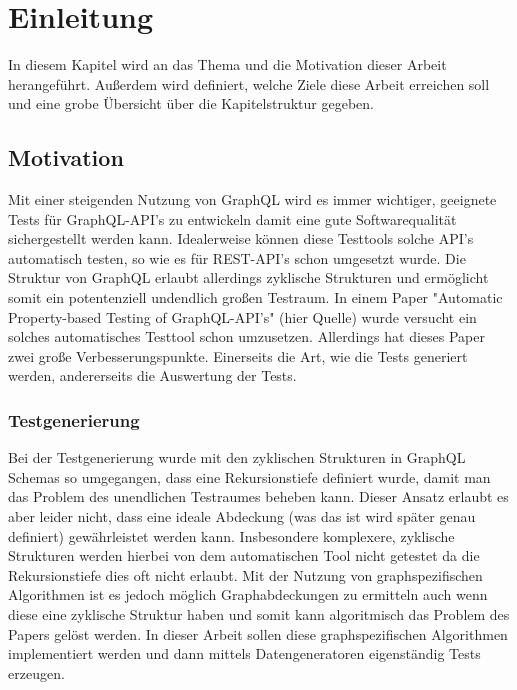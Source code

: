 \section{Einleitung}

In diesem Kapitel wird an das Thema und die Motivation dieser Arbeit herangeführt.
Außerdem wird definiert, welche Ziele diese Arbeit erreichen soll und eine grobe Übersicht über die
Kapitelstruktur gegeben.

\subsection{Motivation}

Mit einer steigenden Nutzung von GraphQL wird es immer wichtiger, geeignete Tests für GraphQL-API's zu entwickeln damit eine
gute Softwarequalität sichergestellt werden kann. Idealerweise können diese Testtools solche API's automatisch testen,
so wie es für REST-API's schon umgesetzt wurde. Die Struktur von GraphQL erlaubt allerdings zyklische Strukturen
und ermöglicht somit ein potentenziell undendlich großen Testraum.
In einem Paper "Automatic Property-based Testing of GraphQL-API's" (hier Quelle) wurde versucht ein solches
automatisches Testtool schon umzusetzen. Allerdings hat dieses Paper zwei große Verbesserungspunkte. 
Einerseits die Art, wie die Tests generiert werden, andererseits die Auswertung der Tests.

\subsubsection*{Testgenerierung}

Bei der Testgenerierung wurde mit den zyklischen Strukturen in GraphQL Schemas so
umgegangen, dass eine Rekursionstiefe definiert wurde, damit man das Problem des unendlichen Testraumes beheben kann.
Dieser Ansatz erlaubt es aber leider nicht, dass eine ideale Abdeckung (was das ist wird später genau
definiert) gewährleistet werden kann.
Insbesondere komplexere, zyklische Strukturen werden hierbei von dem automatischen
Tool nicht getestet da die Rekursionstiefe dies oft nicht erlaubt.
Mit der Nutzung von graphspezifischen Algorithmen ist es jedoch möglich Graphabdeckungen zu ermitteln auch wenn diese
eine zyklische Struktur haben und somit kann algoritmisch das Problem des Papers gelöst werden.
In dieser Arbeit sollen diese graphspezifischen Algorithmen implementiert werden und dann mittels Datengeneratoren eigenständig
Tests erzeugen.

